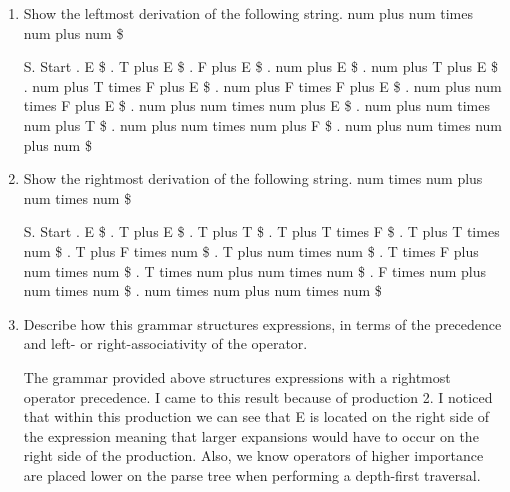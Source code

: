 \documentclass[letterpaper, 10pt,DIV=13]{scrartcl}
\numberwithin{equation}{section} %
\numberwithin{figure}{section} %
\numberwithin{table}{section} %
\begin{document}
\begin{enumerate}
    \item Show the leftmost derivation of the following string.
num plus num times num plus num \$
    
    S. Start . E \$ . T plus E \$ . F plus E \$ . num plus E \$ . num plus T plus E \$ . num plus T times F plus E \$ . num plus F times F plus E \$ . num plus num times F plus E \$ . num plus num times num plus E \$ . num plus num times num plus T \$ . num plus num times num plus F \$ . num plus num times num plus num \$ \newline
    
    \item Show the rightmost derivation of the following string.
num times num plus num times num \$

    S. Start . E \$ . T plus E \$ . T plus T \$ . T plus T times F \$ . T plus T times num \$ . T plus F times num \$ . T plus num times num \$ . T times F plus num times num \$ . T times num plus num times num \$ . F times num plus num times num \$ . num times num plus num times num \$ \newline


    \item Describe how this grammar structures expressions, in terms of the precedence and left- or right-associativity of the operator.

    The grammar provided above structures expressions with a rightmost operator precedence. I came to this result because of production 2. I noticed that within this production we can see that E is located on the right side of the expression meaning that larger expansions would have to occur on the right side of the production. Also, we know operators of higher importance are placed lower on the parse tree when performing a depth-first traversal.
\end{enumerate}
\end{document}
